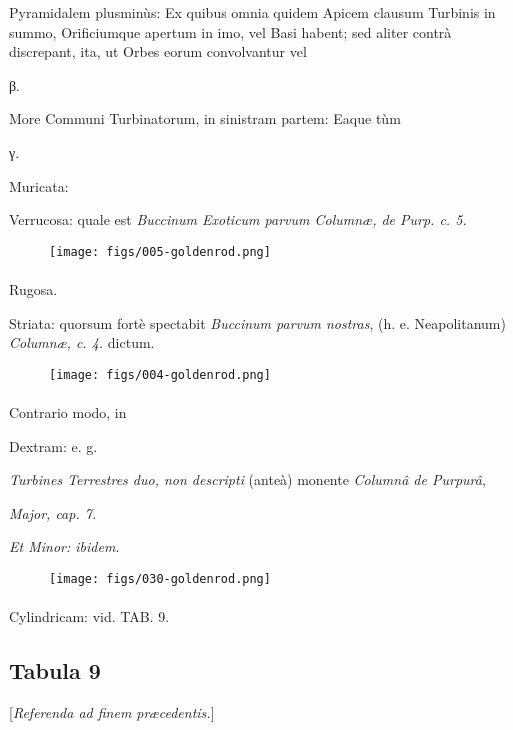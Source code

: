 \documentclass[a4paper, 11pt, oneside, polutonikogreek, german]{article}
\begin{document}
Pyramidalem plusminùs: Ex quibus omnia quidem Apicem clausum Turbinis in summo, Orificiumque apertum in imo, vel Basi habent; sed aliter contrà discrepant, ita, ut Orbes eorum convolvantur vel

β.

More Communi Turbinatorum, in sinistram partem: Eaque tùm

γ.

Muricata:

Verrucosa: quale est \emph{Buccinum Exoticum parvum Columnæ, de Purp. c. 5.}

\begin{figure}[H]
\centering
\texttt{[image: figs/005-goldenrod.png]}
\end{figure}
\paragraph{}
Rugosa.

Striata: quorsum fortè spectabit \emph{Buccinum parvum nostras}, (h. e. Neapolitanum) \emph{Columnæ, c. 4.} dictum.

\begin{figure}[H]
\centering
\texttt{[image: figs/004-goldenrod.png]}
\end{figure}
\paragraph{}
Contrario modo, in

Dextram: e. g.

\emph{Turbines Terrestres duo, non descripti} (anteà) monente \emph{Columnâ de Purpurâ},

\emph{Major, cap. 7.}

\emph{Et Minor: ibidem.}

\begin{figure}[H]
\centering
\texttt{[image: figs/030-goldenrod.png]}
\end{figure}
\paragraph{}
Cylindricam: vid. TAB. 9.
\clearpage
\subsection{Tabula 9}
\begin{center}
[\emph{Referenda ad finem præcedentis.}]
\end{center}
\end{document}
